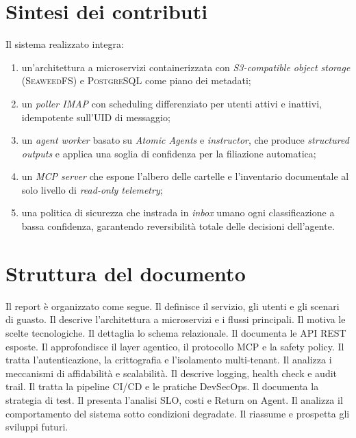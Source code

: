 \section{Sintesi dei contributi}
\label{sec:contributi}

Il sistema realizzato integra:
\begin{enumerate}[leftmargin=*]
    \item un'architettura a microservizi containerizzata con \emph{S3-compatible object
          storage} (\textsc{SeaweedFS}) e \textsc{PostgreSQL} come piano dei metadati;
    \item un \emph{poller IMAP} con scheduling differenziato per utenti attivi e inattivi,
          idempotente sull'\textsc{UID} di messaggio;
    \item un \emph{agent worker} basato su \emph{Atomic Agents} e \emph{instructor},
          che produce \emph{structured outputs} e applica una soglia di confidenza per la
          filiazione automatica;
    \item un \emph{MCP server} che espone l'albero delle cartelle e l'inventario
          documentale al solo livello di \emph{read-only telemetry};
    \item una politica di sicurezza che instrada in \emph{inbox} umano ogni
          classificazione a bassa confidenza, garantendo reversibilit\`a totale delle
          decisioni dell'agente.
\end{enumerate}

\section{Struttura del documento}
\label{sec:struttura}

Il report \`e organizzato come segue. Il  definisce il servizio,
gli utenti e gli scenari di guasto. Il  descrive l'architettura
a microservizi e i flussi principali. Il  motiva le scelte tecnologiche.
Il  dettaglia lo schema relazionale. Il  documenta
le API REST esposte. Il  approfondisce il layer agentico, il protocollo
MCP e la safety policy. Il  tratta l'autenticazione, la crittografia
e l'isolamento multi-tenant. Il  analizza i meccanismi di affidabilit\`a
e scalabilit\`a. Il  descrive logging, health check e audit trail.
Il  tratta la pipeline CI/CD e le pratiche DevSecOps. Il
 documenta la strategia di test. Il  presenta l'analisi
SLO, costi e Return on Agent. Il  analizza il comportamento del sistema
sotto condizioni degradate. Il  riassume e prospetta gli sviluppi futuri.
